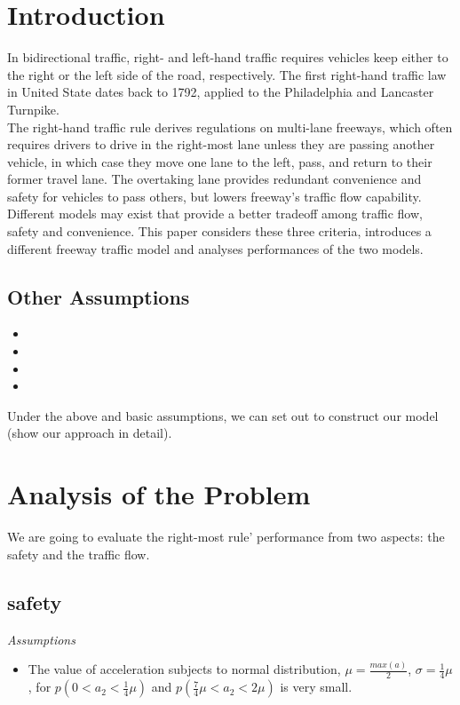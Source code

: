 
\section{Introduction}
In bidirectional traffic, right- and left-hand traffic requires 
vehicles keep either to the right or the left side of the road, 
respectively.\cite{Draper_Geoff_1993} The first right-hand 
traffic law in United State dates back to 1792, applied to the 
Philadelphia and Lancaster Turnpike.\cite{Weingroff_Richard_2014}\\

The right-hand traffic rule derives regulations on multi-lane 
freeways, which often requires drivers to drive in the 
right-most lane unless they are passing another vehicle, in 
which case they move one lane to the left, pass, and return 
to their former travel lane. The overtaking lane provides 
redundant convenience and safety for vehicles to pass others, 
but lowers freeway's traffic flow capability.\\

Different models may exist that provide a better tradeoff 
among traffic flow, safety and convenience. This paper 
considers these three criteria, introduces a different 
freeway traffic model and analyses performances of the two 
models.


\subsection{Other Assumptions}

\begin{itemize}
\item
\item
\item
\item
\end{itemize}

 Under the above and basic assumptions, we can set out
to construct our model (show our approach in detail).
\section{Analysis of the Problem }
We are going to evaluate the right-most rule' performance from two aspects: the safety and the traffic flow.
\subsection{safety}
\emph{Assumptions}
\begin{itemize}
\item The value of acceleration subjects to normal distribution, $\mu = \frac{max(a)}{2}$,
$\sigma = \frac{1}{4}\mu$, for $p(0 < a_2 < \frac{1}{4} \mu)$ and $p(\frac{7}{4} \mu < a_2 < 2\mu)$ is very small.
\end{itemize}

